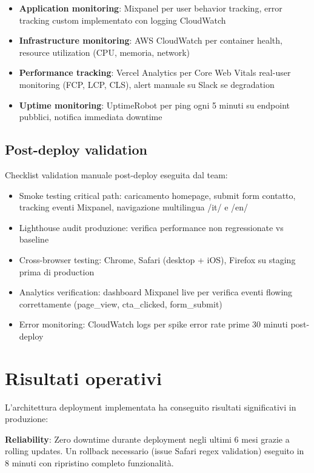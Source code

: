 \begin{itemize}
  \item \textbf{Application monitoring}: Mixpanel per user behavior tracking, error tracking custom implementato con logging CloudWatch
  \item \textbf{Infrastructure monitoring}: AWS CloudWatch per container health, resource utilization (CPU, memoria, network)
  \item \textbf{Performance tracking}: Vercel Analytics per Core Web Vitals real-user monitoring (FCP, LCP, CLS), alert manuale su Slack se degradation
  \item \textbf{Uptime monitoring}: UptimeRobot per ping ogni 5 minuti su endpoint pubblici, notifica immediata downtime
\end{itemize}

\subsection{Post-deploy validation}

Checklist validation manuale post-deploy eseguita dal team:

\begin{itemize}
  \item Smoke testing critical path: caricamento homepage, submit form contatto, tracking eventi Mixpanel, navigazione multilingua /it/ e /en/
  \item Lighthouse audit produzione: verifica performance non regressionate vs baseline
  \item Cross-browser testing: Chrome, Safari (desktop + iOS), Firefox su staging prima di production
  \item Analytics verification: dashboard Mixpanel live per verifica eventi flowing correttamente (page\_view, cta\_clicked, form\_submit)
  \item Error monitoring: CloudWatch logs per spike error rate prime 30 minuti post-deploy
\end{itemize}

\section{Risultati operativi}

L'architettura deployment implementata ha conseguito risultati significativi in produzione:

\textbf{Reliability}: Zero downtime durante deployment negli ultimi 6 mesi grazie a rolling updates. Un rollback necessario (issue Safari regex validation) eseguito in 8 minuti con ripristino completo funzionalità.

